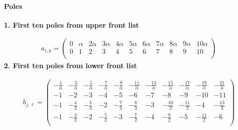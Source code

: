 \documentclass[11pt]{article}
\begin{document}
\paragraph{Poles}

\noindent\textbf{1. First ten poles from upper front list}

\begin{align*}
  a_{i,k} = 
  \left(
\begin{array}{ccccccccccc}
 0 & \alpha  & 2 \alpha  & 3 \alpha  & 4 \alpha  & 5 \alpha  & 6 \alpha  & 7 \alpha  & 8 \alpha  & 9 \alpha  & 10 \alpha  \\
 0 & 1 & 2 & 3 & 4 & 5 & 6 & 7 & 8 & 9 & 10 \\
\end{array}
\right)
\end{align*}
\noindent\textbf{2. First ten poles from lower front list}

\begin{align*}
  b_{j,\ell} = 
  \left(
\begin{array}{ccccccccccc}
 -\frac{1}{\alpha } & -\frac{3}{\alpha } & -\frac{5}{\alpha } & -\frac{7}{\alpha } & -\frac{9}{\alpha } & -\frac{11}{\alpha } & -\frac{13}{\alpha } & -\frac{15}{\alpha } & -\frac{17}{\alpha } & -\frac{19}{\alpha } & -\frac{21}{\alpha } \\
 -1 & -2 & -3 & -4 & -5 & -6 & -7 & -8 & -9 & -10 & -11 \\
 -1 & -\frac{4}{3} & -\frac{5}{3} & -2 & -\frac{7}{3} & -\frac{8}{3} & -3 & -\frac{10}{3} & -\frac{11}{3} & -4 & -\frac{13}{3} \\
 -1 & -\frac{3}{2} & -2 & -\frac{5}{2} & -3 & -\frac{7}{2} & -4 & -\frac{9}{2} & -5 & -\frac{11}{2} & -6 \\
\end{array}
\right)
\end{align*}
\end{document}
